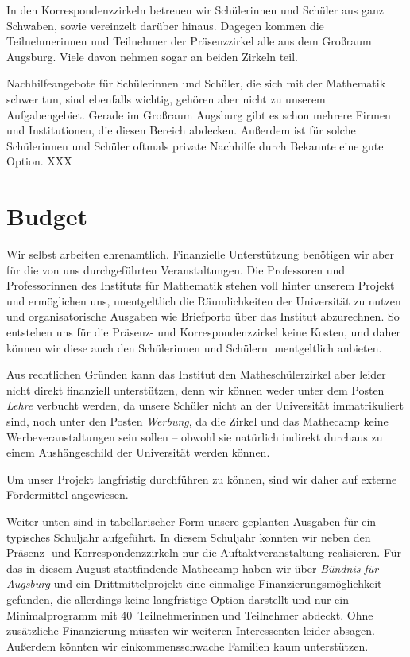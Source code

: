 \documentclass[12pt]{zettel}
\begin{document}
In den Korrespondenzzirkeln betreuen wir Schülerinnen und Schüler aus ganz
Schwaben, sowie vereinzelt darüber hinaus. Dagegen kommen die Teilnehmerinnen
und Teilnehmer der Präsenzzirkel alle aus dem Großraum Augsburg. Viele davon
nehmen sogar an beiden Zirkeln teil.

Nachhilfeangebote für Schülerinnen und Schüler, die sich mit der Mathematik
schwer tun, sind ebenfalls wichtig, gehören aber nicht zu unserem
Aufgabengebiet. Gerade im Großraum Augsburg gibt es schon mehrere Firmen und
Institutionen, die diesen Bereich abdecken. Außerdem ist für solche
Schülerinnen und Schüler oftmals private Nachhilfe durch Bekannte eine gute
Option. XXX


\section{Budget}

Wir selbst arbeiten ehrenamtlich. Finanzielle Unterstützung benötigen wir aber
für die von uns durchgeführten Veranstaltungen. Die Professoren und
Professorinnen des Instituts für Mathematik stehen voll hinter unserem Projekt
und ermöglichen uns, unentgeltlich die Räumlichkeiten der Universität zu nutzen
und organisatorische Ausgaben wie Briefporto über das Institut abzurechnen.
So entstehen uns für die Präsenz- und Korrespondenzzirkel keine Kosten, und
daher können wir diese auch den Schülerinnen und Schülern unentgeltlich
anbieten.

Aus rechtlichen Gründen kann das Institut den Matheschülerzirkel aber leider nicht
direkt finanziell unterstützen, denn wir können weder unter dem Posten
\emph{Lehre} verbucht werden, da unsere Schüler nicht an der Universität
immatrikuliert sind, noch unter den Posten \emph{Werbung}, da die Zirkel und
das Mathecamp keine Werbeveranstaltungen sein sollen -- obwohl sie natürlich indirekt
durchaus zu einem Aushängeschild der Universität werden können.

Um unser Projekt langfristig durchführen zu können, sind wir daher auf externe
Fördermittel angewiesen.

Weiter unten sind in tabellarischer Form unsere geplanten Ausgaben für ein
typisches Schuljahr aufgeführt. In diesem Schuljahr konnten wir
neben den Präsenz- und Korrespondenzzirkeln nur die Auftaktveranstaltung
realisieren. Für das in diesem August
stattfindende Mathecamp haben wir über \emph{Bündnis für Augsburg} und ein
Drittmittelprojekt eine einmalige Finanzierungsmöglichkeit gefunden, die
allerdings keine langfristige Option darstellt und nur ein Minimalprogramm mit 40~Teilnehmerinnen und
Teilnehmer abdeckt. Ohne zusätzliche Finanzierung müssten wir weiteren
Interessenten leider absagen. Außerdem könnten wir einkommensschwache Familien
kaum unterstützen.
\end{document}
